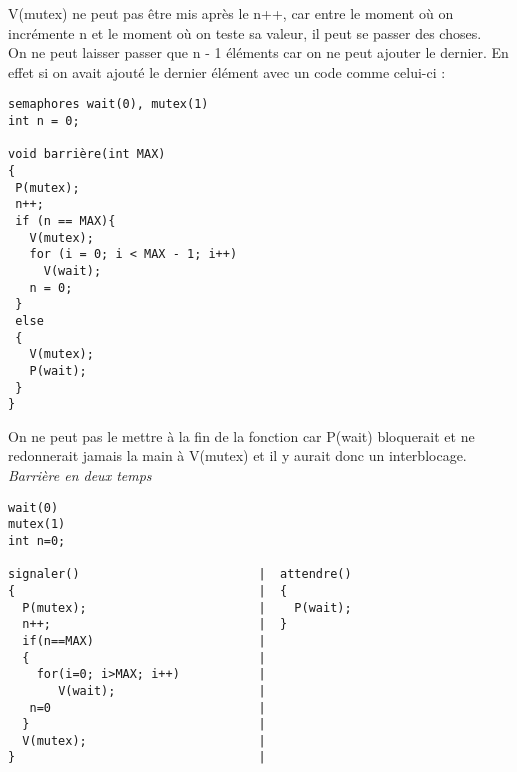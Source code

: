 \documentclass[12pt,a4paper]{report}
\begin{document}
V(mutex) ne peut pas être mis après le n++, car entre le moment où on incrémente n et le moment où on teste sa valeur, il peut se passer des choses.\\
On ne peut laisser passer que n - 1 éléments car on ne peut ajouter le dernier. En effet si on avait ajouté le dernier élément avec un code comme celui-ci :
\medskip
\begin{verbatim}
semaphores wait(0), mutex(1)
int n = 0;

void barrière(int MAX)
{
 P(mutex);
 n++;
 if (n == MAX){
   V(mutex);
   for (i = 0; i < MAX - 1; i++)
     V(wait);
   n = 0;
 }
 else
 {
   V(mutex);
   P(wait);
 }
}
\end{verbatim}
\medskip
On ne peut pas le mettre à la fin de la fonction car P(wait) bloquerait et ne redonnerait jamais la main à V(mutex) et il y aurait donc un interblocage.\\

\textit{Barrière en deux temps}

\begin{center}
\end{center}

\medskip
\begin{verbatim}
wait(0)
mutex(1)
int n=0;

signaler()                         |  attendre()
{                                  |  {
  P(mutex);                        |    P(wait);
  n++;                             |  }
  if(n==MAX)                       |
  {                                |
    for(i=0; i>MAX; i++)           |
       V(wait);                    |
   n=0                             |
  }                                |
  V(mutex);                        |
}                                  |
\end{verbatim}
\medskip
\end{document}
